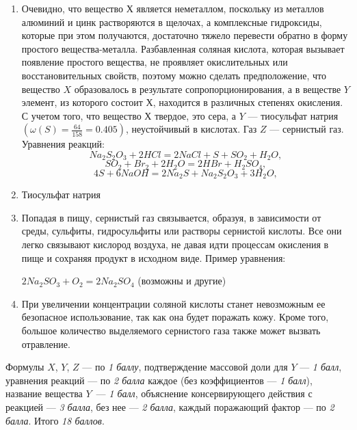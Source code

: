 \solutionSection
\begin{enumerate}
\item Очевидно, что вещество $Х$ является неметаллом, поскольку из металлов алюминий и цинк растворяются в щелочах, а комплексные гидроксиды, которые при этом получаются, достаточно тяжело перевести обратно в форму простого вещества-металла. Разбавленная соляная кислота, которая вызывает появление простого вещества, не проявляет окислительных или восстановительных свойств, поэтому можно сделать предположение, что вещество $X$ образовалось в результате сопропорционирования, а в веществе $Y$ элемент, из которого состоит $Х$, находится в различных степенях окисления. С учетом того, что вещество $Х$ твердое, это сера, а $Y$ — тиосульфат натрия $(\omega(S) = \frac{64}{158} = 0.405)$, неустойчивый в кислотах. Газ $Z$ — сернистый газ. Уравнения реакций:
$$Na_2S_2O_3 + 2HCl = 2NaCl + S + SO_2 + H_2O,$$
$$SO_2 + Br_2 + 2H_2O= 2HBr + H_2SO_4,$$
$$4S + 6NaOH = 2Na_2S + Na_2S_2O_3  + 3H_2O,$$  
\item Тиосульфат натрия
\item Попадая в пищу, сернистый газ связывается, образуя, в зависимости от среды, сульфиты, гидросульфиты или растворы сернистой кислоты. Все они легко связывают кислород воздуха, не давая идти процессам окисления в пище и сохраняя продукт в исходном виде. Пример уравнения: 

$2Na_2SO_3 + O_2 = 2Na_2SO_4$ (возможны и другие)
\item При увеличении концентрации соляной кислоты станет невозможным ее безопасное использование, так как она будет поражать кожу. Кроме того, большое количество выделяемого сернистого газа также может вызвать отравление.  
\end{enumerate}

\additionalCriteria

Формулы $X$, $Y$, $Z$ — по \textit{1 баллу}, подтверждение массовой доли для $Y$ — \textit{1 балл}, уравнения реакций — по \textit{2 балла} каждое (без коэффициентов — \textit{1 балл}), название вещества $Y$~— \textit{1 балл}, объяснение консервирующего действия с реакцией — \textit{3 балла}, без нее — \textit{2 балла},  каждый поражающий фактор — по \textit{2 балла}. Итого \textit{18 баллов}.
